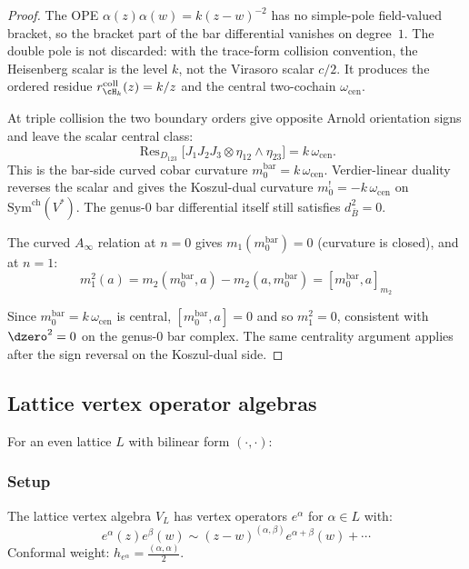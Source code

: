 \begin{proof}
The OPE $\alpha(z)\alpha(w)=k(z-w)^{-2}$ has no simple-pole
field-valued bracket, so the bracket part of the bar differential
vanishes on degree~$1$. The double pole is not discarded: with the
trace-form collision convention, the Heisenberg scalar is the level
$k$, not the Virasoro scalar \(c/2\). It produces the ordered residue
$r_{\cH_k}^{\mathrm{coll}}(z)=k/z$ and the central two-cochain
$\omega_{\mathrm{cen}}$.

At triple collision the two boundary orders give opposite Arnold
orientation signs and leave the scalar central class:
\[
\operatorname{Res}_{D_{123}}
\bigl[J_1J_2J_3\otimes\eta_{12}\wedge\eta_{23}\bigr]
=k\,\omega_{\mathrm{cen}}.
\]
This is the bar-side curved cobar curvature
$m_0^{\mathrm{bar}}=k\,\omega_{\mathrm{cen}}$. Verdier-linear
duality reverses the scalar and gives the Koszul-dual curvature
$m_0^!=-k\,\omega_{\mathrm{cen}}$ on
$\mathrm{Sym}^{\mathrm{ch}}(V^*)$.
The genus-$0$ bar differential itself still satisfies $d_{\bar B}^2=0$.

The curved $A_\infty$ relation at $n = 0$ gives
$m_1(m_0^{\mathrm{bar}}) = 0$ (curvature is closed), and at $n = 1$:
\[m_1^2(a) = m_2(m_0^{\mathrm{bar}}, a) - m_2(a, m_0^{\mathrm{bar}}) = [m_0^{\mathrm{bar}}, a]_{m_2}\]

Since $m_0^{\mathrm{bar}}=k\,\omega_{\mathrm{cen}}$ is central,
$[m_0^{\mathrm{bar}},a]=0$ and so $m_1^2=0$, consistent with
$\dzero^2=0$ on the genus-$0$ bar complex. The same centrality
argument applies after the sign reversal on the Koszul-dual side.
\end{proof}



\subsection{Lattice vertex operator algebras}

For an even lattice $L$ with bilinear form $(\cdot, \cdot)$:

\subsubsection{Setup}

\begin{definition}
The lattice vertex algebra $V_L$ has vertex operators $e^\alpha$ for $\alpha \in L$ with:
\[
e^\alpha(z)e^\beta(w) \sim (z-w)^{(\alpha,\beta)} e^{\alpha+\beta}(w) + \cdots
\]
Conformal weight: $h_{e^\alpha} = \frac{(\alpha,\alpha)}{2}$.
\end{definition}

